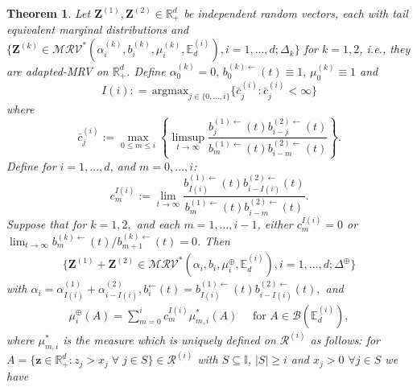 \documentclass[10pt,a4paper]{amsart}
\newtheorem{theorem}{Theorem}
\newcommand{\DAS}[1]{{\color{red} #1}}
\newcommand{\E}{\mathbb{E}}
\def\MRV{\mathcal{MRV}}
\newcommand{\R}{\mathbb{R}}
\newcommand{\VF}[1]{{\color{blue} #1}}
\def\bZ{\boldsymbol Z}
\newcommand{\beao}{\begin{eqnarray*}}
\def\bz{\boldsymbol z}
\def\cR{\mathcal{R}}
\newcommand{\eeao}{\end{eqnarray*}\noindent}
\begin{document}
\begin{theorem} \label{mainTheorem}
Let $\bZ^{(1)}, \bZ^{(2)} \in \R_+^d$ be independent random vectors, each with tail equivalent marginal distributions and $\{\bZ^{(k)}\in \MRV^*(\alpha_i^{(k)},b_i^{(k)},\mu_i^{(k)},\E_d^{(i)}), i=1,\ldots,d; \Delta_k\}$ for $k=1,2$, i.e., they are adapted-MRV on $\R^d_{+}$. Define $\alpha_0^{(k)}=0, \, b_0^{(k)\leftarrow}(t)\equiv 1,\, \mu_0^{(k)}\equiv 1$ and
\[ I(i): =   \,\mathrm{argmax}_{j \in \{0,\ldots,i\}}  \{\bar{c}_j^{(i)}: \bar{c}_j^{(i)}<\infty\}\]
where
\[ \bar{c}_j^{(i)}:= \max_{0\le m\le i}\left\{\limsup_{t\to\infty} \frac{b_{j}^{(1)\leftarrow}(t)b_{i-j}^{(2)\leftarrow}(t)}{b_{m}^{(1)\leftarrow}(t)b_{i-m}^{(2)\leftarrow}(t)} \right\}.\]
Define for $i=1,\ldots, d$, and $m=0,\ldots, i$:
$$c_m^{I(i)}:=\lim_{t\to\infty}\frac{b_{I(i)}^{(1)\leftarrow}(t)b_{i-I(i)}^{(2)\leftarrow}(t)}{b_{m}^{(1)\leftarrow}(t)b_{i-m}^{(2)\leftarrow}(t)}.$$
%
Suppose that for  $k=1,2, $ and each $m=1,\ldots,i-1$, either
$c_m^{I(i)}=0$ or  $\lim_{t\to\infty}b_m^{(k)\leftarrow}(t)/b_{m+1}^{(k)\leftarrow}(t)=0$.
 Then
 \beao
    \{\bZ^{(1)}+\bZ^{(2)}\in\MRV^*(\alpha_{i},b_{i},\mu_{i}^{\oplus},\E_d^{(i)}), i=1,\ldots,d;\Delta^{\oplus}\}
 \eeao
 with $\alpha_i=  \alpha_{I(i)}^{(1)} +\alpha_{i-I(i)}^{(2)}, b_{i}^{\leftarrow}(t)=b_{I(i)}^{(1)\leftarrow}(t)b_{i-{I(i)}}^{(2)\leftarrow}(t), $ and
 \beao
    \mu_i^{\oplus}(A)=\sum_{m=0}^i c_m^{I(i)}\mu_{m,i}^*(A) \quad \text{ for }A\in\mathcal{B}(\E_d^{(i)}),
 \eeao
 where $\mu_{m,i}^*$ is the measure which is uniquely defined on $\cR^{(i)}$ as follows: for \linebreak $A=\{\bz \in \R_+^d: z_j>x_j \;\forall\; j\in S\}\in \cR^{(i)}$ with $S\subseteq \mathbb{I}$, $|S|\ge i$ and $x_j>0$   $\forall j\in S$ we have %

\end{theorem}
\end{document}
